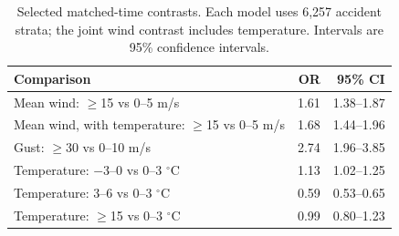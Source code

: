 \begin{table}[H]
\centering
\small
\caption[Selected matched-time contrasts.]{Selected matched-time contrasts. Each model uses 6,257 accident strata; the joint wind contrast includes temperature. Intervals are 95\% confidence intervals.}
\label{tab:matched-time-summary}
\begin{tabularx}{\textwidth}{Xrr}
\toprule
Comparison & OR & 95\% CI \\
\midrule
Mean wind: $\geq$15 vs 0--5 m/s & 1.61 & 1.38--1.87 \\ \grayhline
Mean wind, with temperature: $\geq$15 vs 0--5 m/s & 1.68 & 1.44--1.96 \\ \grayhline
Gust: $\geq$30 vs 0--10 m/s & 2.74 & 1.96--3.85 \\ \grayhline
Temperature: $-3$--0 vs 0--3 $^{\circ}$C & 1.13 & 1.02--1.25 \\ \grayhline
Temperature: 3--6 vs 0--3 $^{\circ}$C & 0.59 & 0.53--0.65 \\ \grayhline
Temperature: $\geq$15 vs 0--3 $^{\circ}$C & 0.99 & 0.80--1.23 \\
\bottomrule
\end{tabularx}
\end{table}

